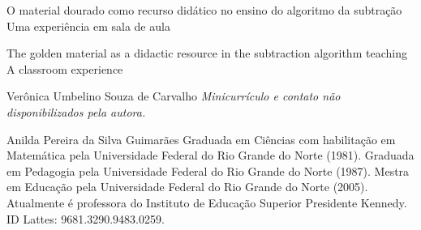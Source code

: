 \begin{refsection}
    \renewcommand{\thefigure}{\arabic{figure}}
    
    \chapterTwoLines
    {O material dourado como recurso didático no ensino do algoritmo da subtração}
    {Uma experiência em sala de aula}
    \label{chap:material-dourado}

    \begin{otherlanguage}{english}

    \fakeChapterTwoLines
    {The golden material as a didactic resource in the subtraction algorithm teaching}
    {A classroom experience}

    \end{otherlanguage}
    
    \articleAuthor
    {Verônica Umbelino Souza de Carvalho}
    {\textit{Minicurrículo e contato não disponibilizados pela autora.}}
    
    \articleAuthor
    {Anilda Pereira da Silva Guimarães}
    {Graduada em Ciências com habilitação em Matemática pela Universidade Federal do Rio Grande do Norte (1981). Graduada em Pedagogia pela Universidade Federal do Rio Grande do Norte (1987). Mestra em Educação pela Universidade Federal do Rio Grande do Norte (2005). Atualmente é professora do Instituto de Educação Superior Presidente Kennedy. ID Lattes: 9681.3290.9483.0259.}
    

\end{refsection}
